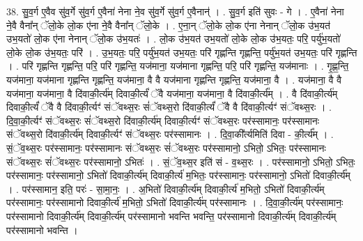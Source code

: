 \documentclass[17pt]{extarticle}
\begin{document}
38. सु॒व॒र्ग ए॒वैव सु॑व॒र्गे सु॑व॒र्ग ए॒वैना॑ नेना ने॒व सु॑व॒र्गे सु॑व॒र्ग ए॒वैनान्॑ । . सु॒व॒र्ग इति॑ सुवः - गे । . ए॒वैना॑ नेना ने॒वै वैना᳚न् ॅलो॒के लो॒क ए॑ना ने॒वै वैना᳚न् ॅलो॒के । . ए॒ना॒न् ॅलो॒के लो॒क ए॑ना नेनान् ॅलो॒क उ॑भ॒यत॑ उभ॒यतो॑ लो॒क ए॑ना नेनान् ॅलो॒क उ॑भ॒यतः॑ । . लो॒क उ॑भ॒यत॑ उभ॒यतो॑ लो॒के लो॒क उ॑भ॒यतः॒ परि॒ पर्यु॑भ॒यतो॑ लो॒के लो॒क उ॑भ॒यतः॒ परि॑ । . उ॒भ॒यतः॒ परि॒ पर्यु॑भ॒यत॑ उभ॒यतः॒ परि॑ गृह्णन्ति गृह्णन्ति॒ पर्यु॑भ॒यत॑ उभ॒यतः॒ परि॑ गृह्णन्ति । . परि॑ गृह्णन्ति गृह्णन्ति॒ परि॒ परि॑ गृह्णन्ति॒ यज॑माना॒ यज॑माना गृह्णन्ति॒ परि॒ परि॑ गृह्णन्ति॒ यज॑मानाः । . गृ॒ह्ण॒न्ति॒ यज॑माना॒ यज॑माना गृह्णन्ति गृह्णन्ति॒ यज॑माना॒ वै वै यज॑माना गृह्णन्ति गृह्णन्ति॒ यज॑माना॒ वै । . यज॑माना॒ वै वै यज॑माना॒ यज॑माना॒ वै दि॑वाकी॒र्त्य॑म् दिवाकी॒र्त्यं॑ ॅवै यज॑माना॒ यज॑माना॒ वै दि॑वाकी॒र्त्य᳚म् । . वै दि॑वाकी॒र्त्य॑म् दिवाकी॒र्त्यं॑ ॅवै वै दि॑वाकी॒र्त्यꣳ॑ संॅवथ्स॒रः सं॑ॅवथ्स॒रो दि॑वाकी॒र्त्यं॑ ॅवै वै दि॑वाकी॒र्त्यꣳ॑ संॅवथ्स॒रः । . दि॒वा॒की॒र्त्यꣳ॑ संॅवथ्स॒रः सं॑ॅवथ्स॒रो दि॑वाकी॒र्त्य॑म् दिवाकी॒र्त्यꣳ॑ संॅवथ्स॒रः पर॑स्सामानः॒ पर॑स्सामानः संॅवथ्स॒रो दि॑वाकी॒र्त्य॑म् दिवाकी॒र्त्यꣳ॑ संॅवथ्स॒रः पर॑स्सामानः । . दि॒वा॒की᳚र्त्यमिति॑ दिवा - की॒र्त्य᳚म् । . सं॒ॅव॒थ्स॒रः पर॑स्सामानः॒ पर॑स्सामानः संॅवथ्स॒रः सं॑ॅवथ्स॒रः पर॑स्सामानो॒ ऽभितो॒ ऽभितः॒ पर॑स्सामानः संॅवथ्स॒रः सं॑ॅवथ्स॒रः पर॑स्सामानो॒ ऽभितः॑ । . सं॒ॅव॒थ्स॒र इति॑ सं - व॒थ्स॒रः । . पर॑स्सामानो॒ ऽभितो॒ ऽभितः॒ पर॑स्सामानः॒ पर॑स्सामानो॒ ऽभितो॑ दिवाकी॒र्त्य॑म् दिवाकी॒र्त्य॑ म॒भितः॒ पर॑स्सामानः॒ पर॑स्सामानो॒ ऽभितो॑ दिवाकी॒र्त्य᳚म् । . पर॑स्सामान॒ इति॒ परः॑ - सा॒मा॒नः॒ । . अ॒भितो॑ दिवाकी॒र्त्य॑म् दिवाकी॒र्त्य॑ म॒भितो॒ ऽभितो॑ दिवाकी॒र्त्य॑म् पर॑स्सामानः॒ पर॑स्सामानो दिवाकी॒र्त्य॑ म॒भितो॒ ऽभितो॑ दिवाकी॒र्त्य॑म् पर॑स्सामानः । . दि॒वा॒की॒र्त्य॑म् पर॑स्सामानः॒ पर॑स्सामानो दिवाकी॒र्त्य॑म् दिवाकी॒र्त्य॑म् पर॑स्सामानो भवन्ति भवन्ति॒ पर॑स्सामानो दिवाकी॒र्त्य॑म् दिवाकी॒र्त्य॑म् पर॑स्सामानो भवन्ति । \newline
\end{document}
